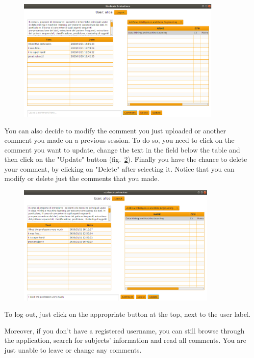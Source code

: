 \documentclass[a4paper]{article}
\begin{document}
\begin{figure}
\centering
\includegraphics[width=0.9\textwidth]{images/screens/screen4}
\label{fig:screen4}
\end{figure}

You can also decide to modify the comment you just uploaded or another comment you made on a previous session. To do so, you need to click on the comment you want to update, change the text in the field below the table and then click on the "Update" button (fig.~\ref{fig:screen5}).
Finally you have the chance to delete your comment, by clicking on "Delete" after selecting it. Notice that you can modify or delete just the comments that you made.

\begin{figure}[h]
\centering
\includegraphics[width=0.88\textwidth]{images/screens/screen5}
\label{fig:screen5}
\end{figure}

To log out, just click on the appropriate button at the top, next to the user label.

Moreover, if you don't have a registered username, you can still browse through the application, search for subjects' information and read all comments. You are just unable to leave or change any comments.
\end{document}
